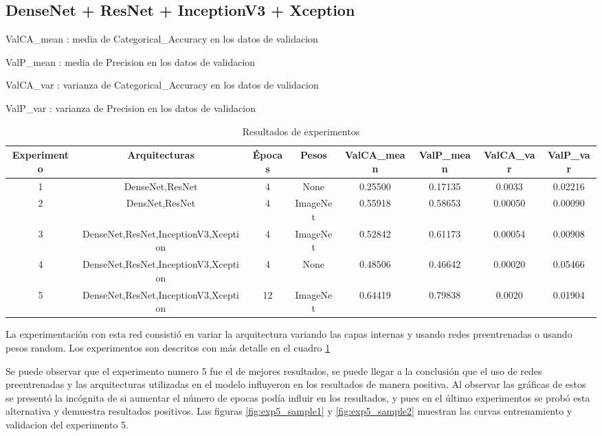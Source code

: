 \documentclass[article]{llncs}
\begin{document}
\subsection{DenseNet + ResNet + InceptionV3 + Xception}

ValCA\_mean : media de Categorical\_Accuracy en los datos de validacion

ValP\_mean : media de Precision en los datos de validacion

ValCA\_var : varianza de Categorical\_Accuracy en los datos de validacion

ValP\_var : varianza de Precision en los datos de validacion

\begin{table}[h]
    \centering
    \begin{tabular}{|c|c|c|c|c|c|c|c|}
    \hline
    Experimento & Arquitecturas & Épocas & Pesos & ValCA\_mean & ValP\_mean & ValCA\_var & ValP\_var \\
    \hline
    1 & DenseNet,ResNet & 4 & None & 0.25500 & 0.17135 & 0.0033 & 0.02216 \\
    2 & DensNet,ResNet & 4 & ImageNet & 0.55918 & 0.58653 & 0.00050 & 0.00090 \\
    3 & DenseNet,ResNet,InceptionV3,Xception & 4 & ImageNet & 0.52842 & 0.61173 & 0.00054 & 0.00908 \\
    4 & DenseNet,ResNet,InceptionV3,Xception & 4 & None & 0.48506 & 0.46642 & 0.00020 & 0.05466 \\
    5 & DenseNet,ResNet,InceptionV3,Xception & 12 & ImageNet & 0.64419 & 0.79838 & 0.0020 & 0.01904 \\
    \hline
    \end{tabular}
    \caption{Resultados de experimentos}
    \label{tab:resultados1}
    \end{table}

La experimentaci\'on con esta red consisti\'o en variar la arquitectura variando las capas internas y usando redes 
preentrenadas o usando pesos random. Los experimentos son descritos con m\'as detalle en el cuadro \ref{tab:resultados1}

Se puede observar que el experimento numero 5 fue el de mejores resultados, se puede llegar a la conclusión que el uso de 
redes preentrenadas y las arquitecturas utilizadas en el modelo influyeron en los resultados de manera positiva. Al observar 
las gráficas de estos se presentó la incógnita de si aumentar el número de epocas podía influir en los resultados, y pues en 
el último experimentos se probó esta alternativa y demuestra resultados positivos. Las figuras \ref{fig:exp5_sample1} y
\ref{fig:exp5_sample2} muestran las curvas entrenamiento y validacion del experimento 5.
\end{document}

